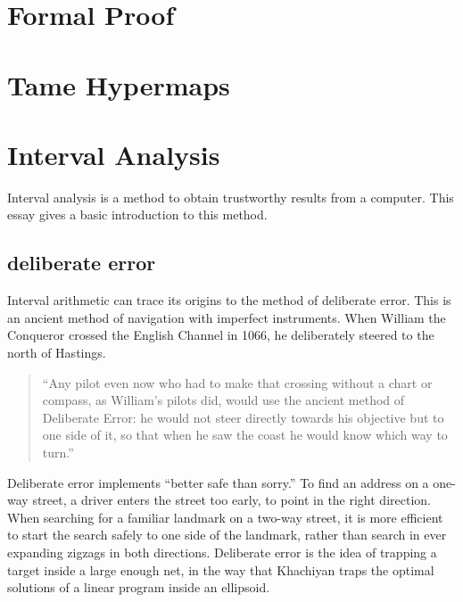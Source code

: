 \section{Formal Proof}

\clearpage
\section{Tame Hypermaps}



\section{Interval Analysis}%
\label{sec:bounds-simplex}

Interval analysis is a method to obtain trustworthy results from a computer.
This essay gives a basic introduction to this method.

\subsection{deliberate error}

Interval arithmetic can trace its origins to the method of deliberate error.
This is an ancient method of navigation with imperfect instruments.  When William
the Conqueror
crossed the English Channel in 1066, he deliberately steered to the north of Hastings.

\begin{quote}
``Any pilot even now who had to make that crossing without a chart or compass,
as William's pilots did, would use the ancient method of Deliberate Error: he would
not steer directly towards his objective but to one side of it, so that when he
saw the coast he would know which way to turn.'' \cite[p81]{How81}
\end{quote}

Deliberate error implements ``better safe than sorry.''
To find an address on a one-way street,  a  driver enters the
street too early, to point in the right direction.  
When searching for a familiar landmark
on a two-way street, it is more efficient  
to start the search safely to one side of the landmark, 
rather than search in ever
expanding zigzags in both directions.  
Deliberate error 
is the idea of trapping a target inside a large enough net, in the
way that
Khachiyan traps the optimal solutions of a linear program inside
an ellipsoid.


